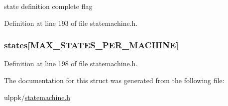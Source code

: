 state definition complete flag 



Definition at line 193 of file statemachine.\-h.

\hypertarget{struct_s_m___s_t_a_t_e___t_a_b_l_e___d_e_f_a890467ba9a24f77386c5830e1bb1dc37}{
\subsubsection[{states}]{ states\mbox{[}{\bf M\-A\-X\-\_\-\-S\-T\-A\-T\-E\-S\-\_\-\-P\-E\-R\-\_\-\-M\-A\-C\-H\-I\-N\-E}\mbox{]}}}\label{struct_s_m___s_t_a_t_e___t_a_b_l_e___d_e_f_a890467ba9a24f77386c5830e1bb1dc37}


Definition at line 198 of file statemachine.\-h.



The documentation for this struct was generated from the following file\-:\begin{DoxyCompactItemize}
\item 
ulppk/\hyperlink{statemachine_8h}{statemachine.\-h}\end{DoxyCompactItemize}
